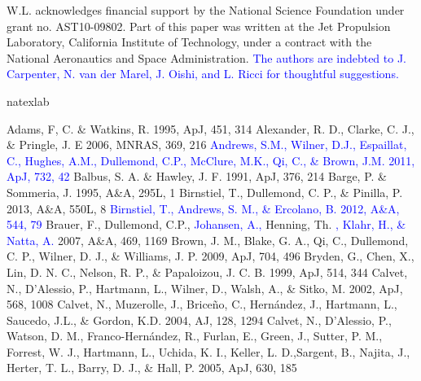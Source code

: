\documentclass[apj]{emulateapj}
\def\blue#1{\textcolor{blue}{ #1}}
\begin{document}
\acknowledgments W.L. acknowledges financial support by the National Science
Foundation under grant no. AST10-09802. Part of this paper was written
at the Jet Propulsion Laboratory, California Institute of Technology, under a contract with the
National Aeronautics and Space Administration. \blue{The authors are
  indebted to J. Carpenter, N. van der Marel, J. Oishi, and L. Ricci for thoughtful suggestions.} 

\begin{thebibliography}{}
\expandafter\ifx\csname natexlab\endcsname\relax\def\natexlab#1{#1}\fi

 Adams, F, C. \& Watkins, R. 1995, ApJ, 451, 314
 Alexander, R. D., Clarke, C. J., \& Pringle, J. E 2006, MNRAS, 369, 216
\bibitem[{{\blue{Andrews et al.}}(2011)}]{Andrews11} \blue{Andrews, S.M., Wilner, D.J., Espaillat, C., Hughes, A.M., Dullemond, C.P., McClure, M.K., Qi, C., \& Brown, J.M. 2011, ApJ, 732, 42} 
 Balbus, S. A. \&  Hawley, J. F. 1991, ApJ, 376, 214
 Barge, P. \&  Sommeria, J. 1995, A\&A, 295L, 1
 Birnstiel, T., Dullemond, C. P., \& Pinilla, P. 2013, A\&A, 550L, 8
\bibitem[{{\blue{Birnstiel et al.}}(2012)}]{Birnstiel12} \blue{Birnstiel, T., Andrews, S. M., \& Ercolano, B. 2012, A\&A, 544, 79}
 Brauer, F., Dullemond, C.P., \blue{Johansen, A.,} Henning, Th.\blue{, Klahr, H., \& Natta, A.} 2007, A\&A, 469, 1169
 Brown, J. M., Blake, G. A., Qi, C., Dullemond, C. P., Wilner, D. J., \& Williams, J. P. 2009, ApJ, 704, 496
 Bryden, G., Chen, X., Lin, D. N. C., Nelson, R. P., \& Papaloizou, J. C. B. 1999, ApJ, 514, 344
 Calvet, N., D'Alessio, P., Hartmann, L., Wilner, D., Walsh, A., \& Sitko, M. 2002, ApJ, 568, 1008
 Calvet, N., Muzerolle, J., Brice\~no, C.,  Hern\'andez, J., Hartmann, L., Saucedo, J.L., \& Gordon, K.D. 2004, AJ, 128, 1294
 Calvet, N., D'Alessio, P., Watson, D. M., Franco-Hern\'andez, R., Furlan, E., Green, J., Sutter, P. M., Forrest, W. J., Hartmann, L., Uchida, K. I., Keller, L. D.,Sargent, B., Najita, J., Herter, T. L., Barry, D. J., \& Hall, P. 2005, ApJ, 630, 185

\end{thebibliography}
\end{document}
